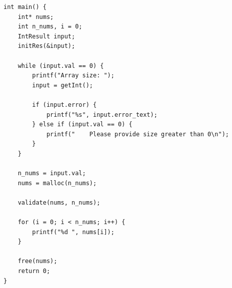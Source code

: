 \documentclass[a4paper, 12pt]{article}
\begin{document}
\begin{verbatim}
int main() {
    int* nums;
    int n_nums, i = 0;
    IntResult input;
    initRes(&input);

    while (input.val == 0) {
        printf("Array size: ");
        input = getInt();

        if (input.error) {
            printf("%s", input.error_text);
        } else if (input.val == 0) {
            printf("    Please provide size greater than 0\n");
        }
    }

    n_nums = input.val;
    nums = malloc(n_nums);

    validate(nums, n_nums);

    for (i = 0; i < n_nums; i++) {
        printf("%d ", nums[i]);
    }

    free(nums);
    return 0;
}
\end{verbatim}
\end{document}
